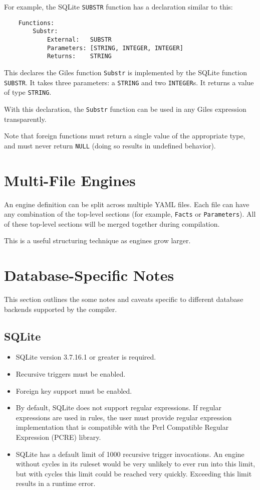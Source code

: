 \documentclass[letterpaper,10pt]{article}
\begin{document}
For example, the SQLite \texttt{SUBSTR} function has a declaration similar to this:

\begin{lstlisting}
    Functions:
        Substr:
            External:   SUBSTR
            Parameters: [STRING, INTEGER, INTEGER]
            Returns:    STRING
\end{lstlisting}

This declares the Giles function \texttt{Substr} is implemented by the SQLite function \texttt{SUBSTR}.
It takes three parameters: a \texttt{STRING} and two \texttt{INTEGER}s.
It returns a value of type \texttt{STRING}.

With this declaration, the \texttt{Substr} function can be used in any Giles expression transparently.

Note that foreign functions must return a single value of the appropriate type, and must never return \texttt{NULL} (doing so results in undefined behavior).

\section{Multi-File Engines}
An engine definition can be split across multiple YAML files.
Each file can have any combination of the top-level sections (for example, \texttt{Facts} or \texttt{Parameters}).
All of these top-level sections will be merged together during compilation.

This is a useful structuring technique as engines grow larger.

\section{Database-Specific Notes}
This section outlines the some notes and caveats specific to different database backends supported by the compiler.

\subsection{SQLite}
\begin{itemize}
    \item SQLite version 3.7.16.1 or greater is required.
    \item Recursive triggers must be enabled.
    \item Foreign key support must be enabled.
    \item By default, SQLite does not support regular expressions.
          If regular expressions are used in rules, the user must provide regular expression implementation that is compatible with the Perl Compatible Regular Expression (PCRE) library.
    \item SQLite has a default limit of 1000 recursive trigger invocations.
          An engine without cycles in its ruleset would be very unlikely to ever run into this limit, but with cycles this limit could be reached very quickly.
          Exceeding this limit results in a runtime error.
\end{itemize}
\end{document}
